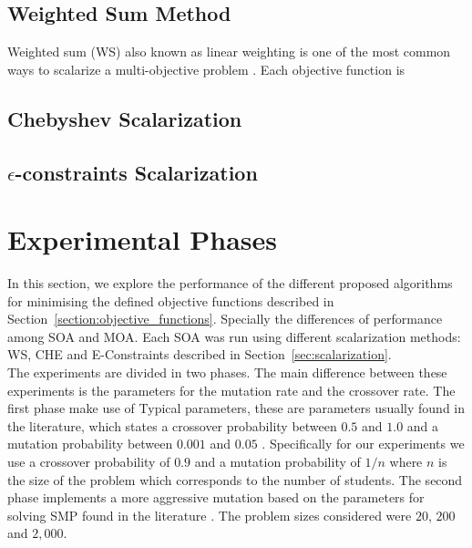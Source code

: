 \subsection{Weighted Sum Method}

Weighted sum (WS) also known as linear weighting is one of the most common ways to scalarize a multi-objective problem \cite{CooperWilliamW.2010}. Each objective function is 


\subsection{Chebyshev Scalarization}

\subsection{$\epsilon$-constraints Scalarization}


\section{Experimental Phases}
\label{sec:first_phase}

In this section, we explore the performance of the different proposed algorithms for minimising the defined objective functions described in Section~\ref{section:objective_functions}. Specially the differences of performance among SOA and MOA. Each SOA was run using different scalarization methods: WS, CHE and E-Constraints described in Section~\ref{sec:scalarization}. \\

The experiments are divided in two phases. The main difference between these experiments is the parameters for the mutation rate and the crossover rate. The first phase make use of Typical parameters, these are parameters usually found in the literature, which states a crossover probability between $0.5$ and $1.0$ and a mutation probability between $0.001$ and $0.05$ \cite{Lin2003}. Specifically for our experiments we use a crossover probability of $0.9$ and a mutation probability of $1/n$ where $n$ is the size of the problem which corresponds to the number of students. The second phase implements a more aggressive mutation based on the parameters for solving SMP found in the literature \cite{bello2016genetic}. The problem sizes considered were $20$, $200$ and $2,000$.\\

